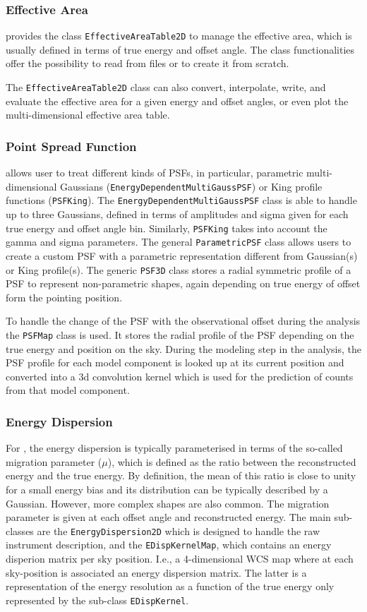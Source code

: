 \documentclass[traditabstract, longauth]{aa}
\newcommand{\code}[1]{\texttt{#1}}
\begin{document}
\subsubsection{Effective Area}
\gammapy provides the class \code{EffectiveAreaTable2D} to
manage the effective area, which is usually defined in terms of true energy and offset angle.
The class functionalities offer the possibility to read from files or to create
it from scratch. {The \code{EffectiveAreaTable2D} class can also convert, interpolate,
write, and evaluate the effective area for a given energy and offset angles, or
even plot the multi-dimensional effective area table.


\subsubsection{Point Spread Function}
\gammapy allows user to treat different kinds of PSFs,
in particular, parametric multi-dimensional Gaussians (\code{EnergyDependentMultiGaussPSF})
or King profile functions (\code{PSFKing}). The \code{EnergyDependentMultiGaussPSF}
 class is able to handle up to three
Gaussians, defined in terms of amplitudes and sigma given for each true energy
and offset angle bin. Similarly, \code{PSFKing} takes into account the gamma and
sigma parameters. The general \code{ParametricPSF} class allows users to create a
custom PSF with a parametric representation different from Gaussian(s) or King profile(s).
The generic \code{PSF3D} class stores a radial symmetric profile of a
PSF to represent non-parametric shapes, again depending on true energy
of offset form the pointing position.

To handle the change of the PSF with the observational offset during the analysis 
the \code{PSFMap} class is used. It stores the radial profile of the PSF
depending on the true energy and position on the sky. During the modeling
step in the analysis, the PSF profile for each model component is 
looked up at its current position and converted into a 3d convolution kernel
which is used for the prediction of counts from that model component.


\subsubsection{Energy Dispersion}
For \iacts, the energy dispersion is typically parameterised in terms of the so-called
migration parameter ($\mu$), which is defined as the ratio between the
reconstructed energy and the true energy. By definition, the mean of this ratio is
close to unity for a small energy bias and its distribution can 
be typically described by a Gaussian. However, more complex
shapes are also common. The migration parameter is given at each offset angle and
reconstructed energy. The main sub-classes are the \code{EnergyDispersion2D} which is
designed to handle the raw instrument description, and the \code{EDispKernelMap},
which contains an energy disperion matrix per sky position. I.e., a 4-dimensional WCS map
where at each sky-position is associated an energy dispersion matrix.
The latter is a representation of the energy resolution as a function of the
true energy only represented by the sub-class \code{EDispKernel}.

}
\end{document}
